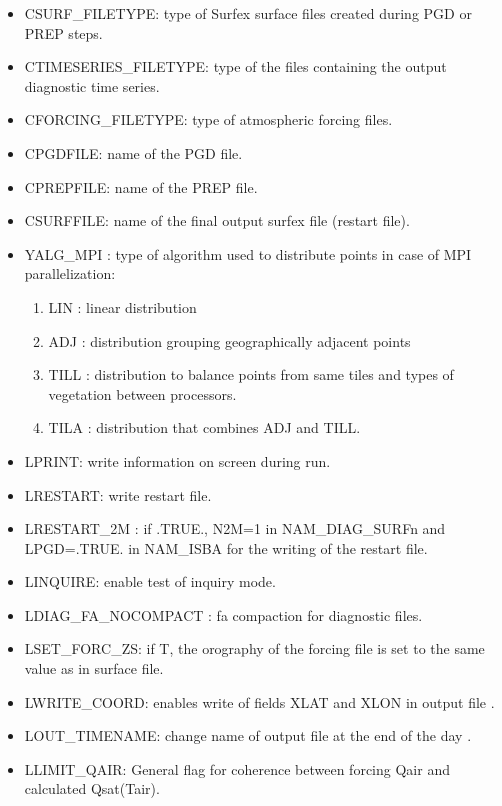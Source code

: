 \begin{itemize}
	\item CSURF\_FILETYPE: type of Surfex surface files created during PGD or PREP steps. %
	\item CTIMESERIES\_FILETYPE: type of the files containing the output diagnostic time series. %
	\item CFORCING\_FILETYPE: type of atmospheric forcing files.
	\item CPGDFILE: name of the PGD file.
	\item CPREPFILE: name of the PREP file.
	\item CSURFFILE: name of the final output surfex file (restart file).
	\item YALG\_MPI : type of algorithm used to distribute points in case of MPI parallelization:
		\begin{enumerate}
			\item LIN : linear distribution
			\item ADJ : distribution grouping geographically adjacent points
			\item TILL : distribution to balance points from same tiles and types of vegetation between processors.
			\item TILA : distribution that combines ADJ and TILL.
		\end{enumerate}
	\item LPRINT: write information on screen during run.
	\item LRESTART: write restart file.
	\item LRESTART\_2M : if .TRUE., N2M=1 in NAM\_DIAG\_SURFn and LPGD=.TRUE. in NAM\_ISBA for the writing of the restart file.
	\item LINQUIRE: enable test of inquiry mode.
	\item LDIAG\_FA\_NOCOMPACT : fa compaction for diagnostic files.
	\item LSET\_FORC\_ZS: if T, the orography of the forcing file is set to the same value as in surface file.
	\item LWRITE\_COORD: enables write of fields XLAT and XLON in output file .
	\item LOUT\_TIMENAME: change name of output file at the end of the day .
	\item LLIMIT\_QAIR: General flag for coherence between forcing Qair and calculated Qsat(Tair).

\end{itemize}
